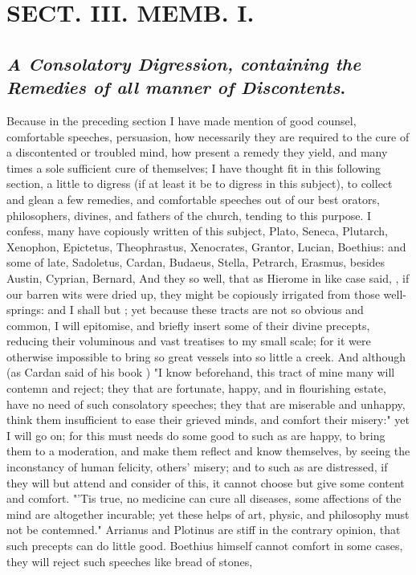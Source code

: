 {\chapter{ SECT. III. MEMB. I.}


\section{\emph{A Consolatory Digression, containing the Remedies of all manner of Discontents}.}


Because in the preceding section I have made mention of good counsel, comfortable speeches, persuasion, how necessarily they are required to the cure of a discontented or troubled mind, how present a remedy they yield, and many times a sole sufficient cure of themselves; I have thought fit in this following section, a little to digress (if at least it be to digress in this subject), to collect and glean a few remedies, and comfortable speeches out of our best orators, philosophers, divines, and fathers of the church, tending to this purpose. I confess, many have copiously written of this subject, Plato, Seneca, Plutarch, Xenophon, Epictetus, Theophrastus, Xenocrates, Grantor, Lucian, Boethius: and some of late, Sadoletus, Cardan, Budaeus, Stella, Petrarch, Erasmus, besides Austin, Cyprian, Bernard, \etc{} And they so well, that as Hierome in like case said, , if our barren wits were dried up, they might be copiously irrigated from those well-springs: and I shall but ; yet because these tracts are not so obvious and common, I will epitomise, and briefly insert some of their divine precepts, reducing their voluminous and vast treatises to my small scale; for it were otherwise impossible to bring so great vessels into so little a creek. And although (as Cardan said of his book ) "I know beforehand, this tract of mine many will contemn and reject; they that are fortunate, happy, and in flourishing estate, have no need of such consolatory speeches; they that are miserable and unhappy, think them insufficient to ease their grieved minds, and comfort their misery:" yet I will go on; for this must needs do some good to such as are happy, to bring them to a moderation, and make them reflect and know themselves, by seeing the inconstancy of human felicity, others' misery; and to such as are distressed, if they will but attend and consider of this, it cannot choose but give some content and comfort. "'Tis true, no medicine can cure all diseases, some affections of the mind are altogether incurable; yet these helps of art, physic, and philosophy must not be contemned." Arrianus and Plotinus are stiff in the contrary opinion, that such precepts can do little good. Boethius himself cannot comfort in some cases, they will reject such speeches like bread of stones,  

}
